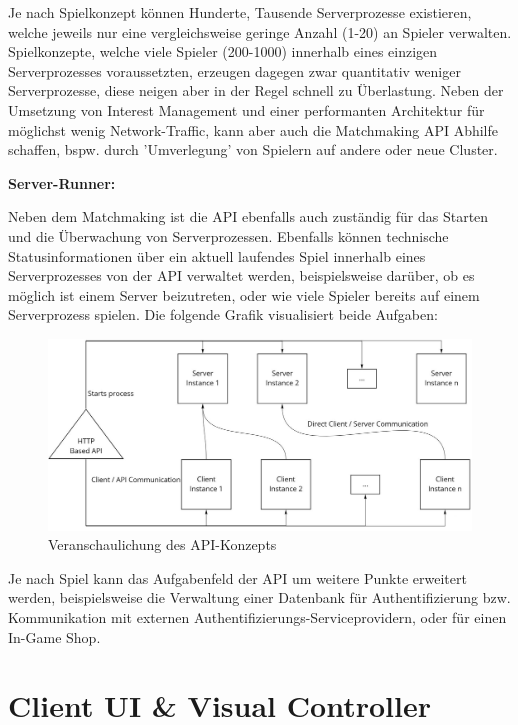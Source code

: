 Je nach Spielkonzept können Hunderte, Tausende Serverprozesse existieren, welche jeweils nur eine vergleichsweise geringe Anzahl (1-20) an Spieler verwalten. Spielkonzepte, welche viele Spieler (200-1000) innerhalb eines einzigen Serverprozesses voraussetzten, erzeugen dagegen zwar quantitativ weniger Serverprozesse, diese neigen aber in der Regel schnell zu Überlastung. Neben der Umsetzung von Interest Management und einer performanten Architektur für möglichst wenig Network-Traffic, kann aber auch die Matchmaking API Abhilfe schaffen, bspw. durch 'Umverlegung' von Spielern auf andere oder neue Cluster.

\textbf{Server-Runner:}

Neben dem Matchmaking ist die API ebenfalls auch zuständig für das Starten und die Überwachung von Serverprozessen.
Ebenfalls können technische Statusinformationen über ein aktuell laufendes Spiel innerhalb eines Serverprozesses von der API verwaltet werden, beispielsweise darüber, ob es möglich ist einem Server beizutreten, oder wie viele Spieler bereits auf einem Serverprozess spielen. Die folgende Grafik visualisiert beide Aufgaben:

\begin{figure}[H]
	\centering
	\includegraphics[width=120mm]{images/API_Konzept_Diagramm.jpg}
	\caption[API Konzept Diagramm]{Veranschaulichung des API-Konzepts}
	\label{pic:API_Konzept_Diagramm}
\end{figure}

Je nach Spiel kann das Aufgabenfeld der API um weitere Punkte erweitert werden, beispielsweise die Verwaltung einer Datenbank für Authentifizierung bzw. Kommunikation mit externen Authentifizierungs-Serviceprovidern, oder für einen In-Game Shop.

\section{Client UI \& Visual Controller}

